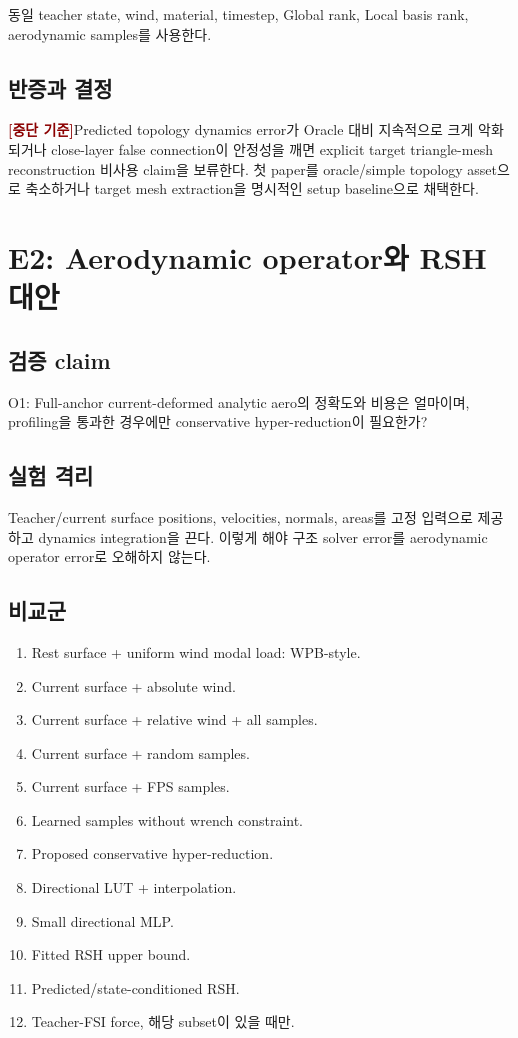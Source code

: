\documentclass[11pt,a4paper]{article}
\newcommand{\killgate}{\textcolor{darkred}{\textbf{[중단 기준]}}}
\begin{document}
동일 teacher state, wind, material, timestep, Global rank,
Local basis rank, aerodynamic samples를 사용한다.

\subsection*{반증과 결정}

\killgate Predicted topology dynamics error가 Oracle 대비 지속적으로 크게 악화되거나
close-layer false connection이 안정성을 깨면
explicit target triangle-mesh reconstruction 비사용 claim을 보류한다.
첫 paper를 oracle/simple topology asset으로 축소하거나
target mesh extraction을 명시적인 setup baseline으로 채택한다.

\section{E2: Aerodynamic operator와 RSH 대안}

\subsection*{검증 claim}

O1: Full-anchor current-deformed analytic aero의 정확도와 비용은 얼마이며,
profiling을 통과한 경우에만 conservative hyper-reduction이 필요한가?

\subsection*{실험 격리}

Teacher/current surface positions, velocities, normals, areas를 고정 입력으로 제공하고
dynamics integration을 끈다.
이렇게 해야 구조 solver error를 aerodynamic operator error로 오해하지 않는다.

\subsection*{비교군}

\begin{enumerate}[leftmargin=1.7em]
  \item Rest surface + uniform wind modal load: WPB-style.
  \item Current surface + absolute wind.
  \item Current surface + relative wind + all samples.
  \item Current surface + random samples.
  \item Current surface + FPS samples.
  \item Learned samples without wrench constraint.
  \item Proposed conservative hyper-reduction.
  \item Directional LUT + interpolation.
  \item Small directional MLP.
  \item Fitted RSH upper bound.
  \item Predicted/state-conditioned RSH.
  \item Teacher-FSI force, 해당 subset이 있을 때만.
\end{enumerate}
\end{document}
